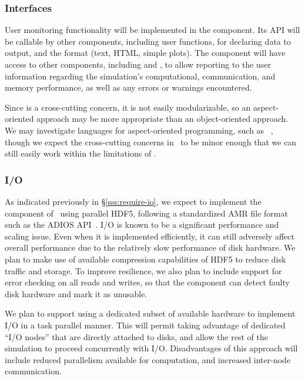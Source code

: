 \documentclass[10pt,twocolumn]{article}
\begin{document}
\subsubsection{Interfaces} \label{sss:design-interfaces}

User monitoring functionality will be implemented in the
 component.  Its API will be callable by other
components, including user functions, for declaring data to output,
and the format (text, HTML, simple plots).  The component will have
access to other components, including  and
, to allow reporting to the user information regarding the
simulation's computational, communication, and memory performance, as
well as any errors or warnings encountered.

Since  is a cross-cutting concern, it is not easily
modularizable, so an aspect-oriented approach may be more appropriate
than an object-oriented approach.  We may investigate languages for
aspect-oriented programming, such as
~\cite{wwwaspectcpp}, though we expect the cross-cutting
concerns in \cello\ to be minor enough that we can still easily work
within the limitations of \cpp.

\subsubsection{I/O} \label{sss:design-io}

As indicated previously in \S\ref{sss:require-io}, we expect to
implement the  component of \cello\ using parallel HDF5,
following a standardized AMR file format such as the ADIOS
API~\cite{LoKl08}.  I/O is known to be a significant performance and
scaling issue.  Even when it is implemented efficiently, it can still
adversely affect overall performance due to the relatively slow
performance of disk hardware.  We plan to make use of available
compression capabilities of HDF5 to reduce disk traffic and storage.
To improve resilience, we also plan to include support for error
checking on all reads and writes, so that the  component
can detect faulty disk hardware and mark it as unusable.

We plan to support using a dedicated subset of available hardware to
implement I/O in a task parallel manner.  This will permit taking
advantage of dedicated ``I/O nodes'' that are directly attached to
disks, and allow the rest of the simulation to proceed concurrently
with I/O.  Disadvantages of this approach will include reduced
parallelism available for computation, and increased inter-node
communication.
\end{document}
